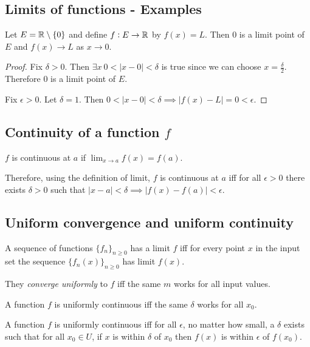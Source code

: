 \subsection{Limits of functions - Examples}

\begin{example}
  Let $E = \mathbb{R}\setminus \{0\}$ and define $f:E \to \mathbb{R}$ by $f(x) = L$. Then 0 is a limit point of
  $E$ and $f(x) \to L$ as $x \to 0$.
\end{example}

\begin{proof}
  Fix $\delta > 0$. Then $\exists x ~ 0 < |x - 0| < \delta$ is true since we can choose
  $x = \frac{\delta}{2}$. Therefore 0 is a limit point of $E$.

  Fix $\epsilon > 0$. Let $\delta = 1$. Then
  $0 < |x - 0| < \delta \implies |f(x) - L| = 0 < \epsilon$.
\end{proof}

\subsection{Continuity of a function $f$}

\begin{definition*}
$f$ is continuous at $a$ if $\lim_{x \to a} f(x) = f(a)$.
\end{definition*}

Therefore, using the definition of limit, $f$ is continuous at $a$ iff for all $\epsilon > 0$
there exists $\delta > 0$ such that $|x - a| < \delta \implies |f(x) - f(a)| < \epsilon$.

\subsection{Uniform convergence and uniform continuity}

\begin{definition*}
A sequence of functions $\{f_n\}_{n\geq 0}$ has a limit $f$ iff for every point
$x$ in the input set the sequence $\{f_n(x)\}_{n\geq 0}$ has limit $f(x)$.

They \textit{converge uniformly} to $f$ iff the same $m$ works for all input
values.
\end{definition*}

\begin{definition*}
A function $f$ is uniformly continuous iff the same $\delta$ works for all $x_0$.

A function $f$ is uniformly continuous iff for all $\epsilon$, no matter how
small, a $\delta$ exists such that for all $x_0 \in U$, if $x$ is within
$\delta$ of $x_0$ then $f(x)$ is within $\epsilon$ of $f(x_0)$.
\end{definition*}

